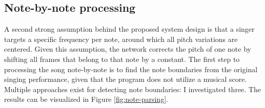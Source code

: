 \subsection{Note-by-note processing}
\label{ref:notes}
A second strong assumption behind the proposed system design is that a singer targets a specific frequency per note, around which all pitch variations are centered. Given this assumption, the network corrects the pitch of one note by shifting all frames that belong to that note by a constant. The first step to processing the song note-by-note is to find the note boundaries from the original singing performance, given that the program does not utilize a musical score. Multiple approaches exist for detecting note boundaries: I investigated three. The results can be visualized in Figure \ref{fig:note-parsing}.

